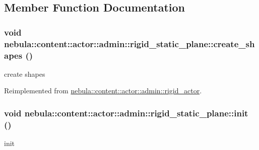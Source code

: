 \subsection{Member Function Documentation}
\hypertarget{classnebula_1_1content_1_1actor_1_1admin_1_1rigid__static__plane_ad967d0a5cd7a1ee7864c28f6b73aff80}{
\subsubsection[{create\_\-shapes}]{\setlength{\rightskip}{0pt plus 5cm}void nebula::content::actor::admin::rigid\_\-static\_\-plane::create\_\-shapes ()}}
\label{classnebula_1_1content_1_1actor_1_1admin_1_1rigid__static__plane_ad967d0a5cd7a1ee7864c28f6b73aff80}


create shapes 

Reimplemented from \hyperlink{classnebula_1_1content_1_1actor_1_1admin_1_1rigid__actor_a6a7daf14ba48ebe539588bfc18784267}{nebula::content::actor::admin::rigid\_\-actor}.\hypertarget{classnebula_1_1content_1_1actor_1_1admin_1_1rigid__static__plane_a5334403f326a185523ef2c7c380ffa8f}{
\subsubsection[{init}]{\setlength{\rightskip}{0pt plus 5cm}void nebula::content::actor::admin::rigid\_\-static\_\-plane::init ()}}
\label{classnebula_1_1content_1_1actor_1_1admin_1_1rigid__static__plane_a5334403f326a185523ef2c7c380ffa8f}


init 

